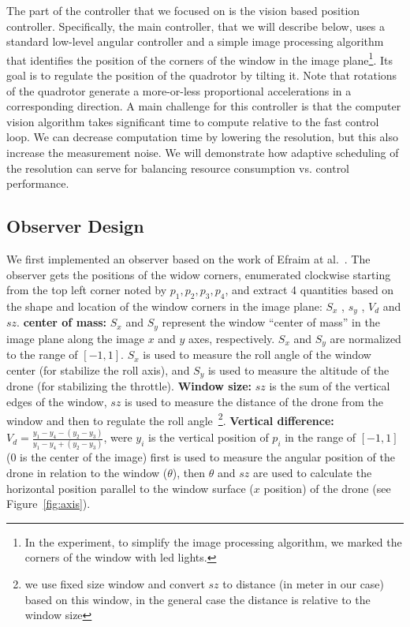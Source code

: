 \documentclass{sig-alternate-ipsn13}
\begin{document}
The part of the controller that we focused on is the vision based position controller. Specifically, the main controller, that we will describe below, uses a standard low-level angular controller and a simple image processing algorithm that identifies the position of the corners of the window in the image plane\footnote{In the experiment, to simplify the image processing algorithm, we marked the corners of the window with led lights.}. Its goal is to regulate the position of the quadrotor by tilting it. Note that rotations of the quadrotor generate a more-or-less proportional accelerations in a corresponding direction. A main challenge for this controller is that the computer vision algorithm takes significant time to compute relative to the fast control loop. We can decrease computation time by lowering the resolution, but this also increase the measurement noise. We will demonstrate how adaptive scheduling of the resolution can serve for balancing resource consumption vs. control performance.

\subsection{Observer Design}
\label{sec:Observer Design}
We first implemented an observer based on the work of Efraim at al.~\cite{?? Dynamic Image Based Visual Servo Control of Micro Aerial Vehicles Relative to a Window}. The observer gets the positions of the widow corners, enumerated clockwise starting from the top left corner noted by $p_1,p_2,p_3,p_4$, and extract 4 quantities based on the shape and location of the window corners in the image plane: $S_x$ , $s_y$ , $V_d$ and $sz$.
\textbf{center of mass:} $S_x$ and $S_y$ represent the window ``center of mass'' in the image plane along the image $x$ and $y$ axes, respectively. $S_x$ and $S_y$ are normalized to the range of $[-1,1]$.
$S_x$ is used to measure the roll angle of the window center (for stabilize the roll axis), and $S_y$ is used to measure the altitude of the drone (for stabilizing the throttle).
\textbf{Window size:} $sz$ is the sum of the vertical edges of the window, $sz$ is used to measure the distance of the drone from the window and then to regulate the roll angle~\footnote{we use fixed size window and convert $sz$ to distance (in meter in our case) based on this window, in the general case the distance is relative to the window size}.
\textbf{Vertical difference:} $V_d = \frac{y_1-y_4-(y_2-y_3)}{y_1-y_4+(y_2-y_3)}$, were $y_i$ is the vertical position of $p_i$ in the range of $[-1,1]$ (0 is the center of the image) first is used to measure the angular position of the drone in relation to the window ($\theta$), then $\theta$ and $sz$ are used to calculate the horizontal position parallel to the window surface ($x$ position) of the drone (see Figure~\ref{fig:axis}). 
\end{document}
